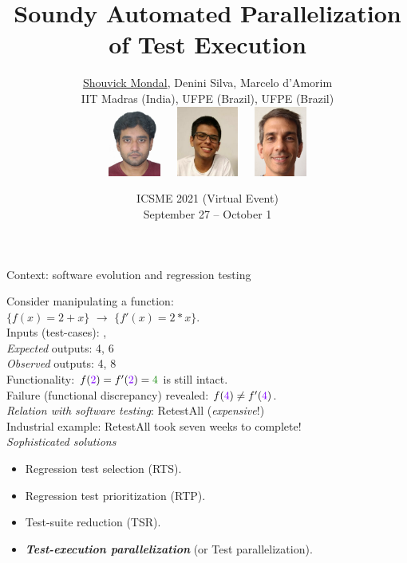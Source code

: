 \documentclass{beamer}
\title[\color{white}ICSME 2021 Research Track Presentation.\hspace{14mm}\disp] %
{Soundy Automated Parallelization\\of Test Execution}
\author[Shouvick Mondal \textit{et al}.] %
{\underline{Shouvick Mondal}, Denini Silva, Marcelo d'Amorim\\\vspace{2mm}
{\scriptsize IIT Madras (India), UFPE (Brazil), UFPE (Brazil)}
\\\vspace{2mm}
\includegraphics[width=0.13\textwidth]{images/shouvick2.jpg}~~~\includegraphics[width=0.15\textwidth]{images/denini.jpg}~~~\includegraphics[width=0.13\textwidth]{images/marcelo.jpg}}
\date{ICSME 2021 (Virtual Event)\\{\scriptsize September 27 -- October 1}} %
\begin{document}
\begingroup
\renewcommand{\disp}{}
\begin{frame}
	\titlepage
\end{frame}
\endgroup

\addtocounter{framenumber}{-1}

\begin{frame}{Context: software evolution and regression testing}
	
{\rsm Consider manipulating a function}:\\
$\{f(x)=2+x\}$ $\rightarrow$ $\{f'(x)=2*x\}$.\\
\vspace{0.3cm}
\pause
Inputs (test-cases): {}, {}\\
\textit{Expected} outputs: {\color{indiagreen}4}, {\color{indiagreen}6}\\\pause
\textit{Observed} outputs: {\color{indiagreen}4}, {\color{red}8}\\
\vspace{0.3cm}\pause
{\color{indiagreen}Functionality}: $f({\rsm 2})=f'({\rsm 2})=\color{indiagreen}4$ is still intact.\\
\vspace{0.3cm}\pause
\vspace{-4mm}
{\color{red} Failure} (functional discrepancy) revealed: $f({\rsm 4})\neq f'({\rsm 4})$.\\
\vspace{0.3cm}\pause
{\textit{Relation with software testing}: RetestAll ({\color{red}\textit{expensive}!})}\\
Industrial example: RetestAll took seven weeks to complete!\footnotemark\\\pause
\vfill
\textit{Sophisticated solutions}
\begin{itemize}
	\item{Regression test {\rsm selection} (RTS).}
	\item{Regression test {\rsm prioritization} (RTP).}
	\item{Test-suite {\rsm reduction} (TSR).}\pause
	\item{\textbf{\color{blue}\textit{Test-execution parallelization}} (or Test parallelization).}
\end{itemize}
\end{frame}
\end{document}
